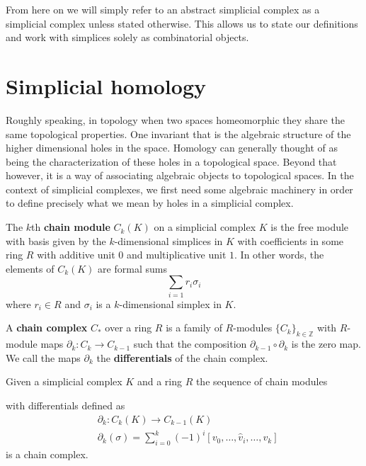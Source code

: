 From here on we will simply refer to an abstract simplicial complex as a simplicial complex unless stated otherwise. This allows us to state our definitions and work with simplices solely as combinatorial objects.
\section{Simplicial homology}
Roughly speaking, in topology when two spaces homeomorphic they share the same topological properties. One invariant that is the algebraic structure of the higher dimensional holes in the space.
Homology can generally thought of as being the characterization of these holes in a topological space. Beyond that however, it is a way of associating algebraic objects to topological spaces. In the context of simplicial complexes, we first need some algebraic machinery in order to define precisely what we mean by holes in a simplicial complex.

\begin{definition}
  The $k$th \textbf{chain module} $C_{k}(K)$ on a simplicial complex $K$ is the free module with basis given by the $k$-dimensional simplices in $K$ with coefficients in some ring $R$ with additive unit $0$ and multiplicative unit $1$. In other words, the elements of $C_{k}(K)$ are formal sums
  \[ \sum_{i=1} r_{i}\sigma_{i}\]
  where $r_{i} \in R$ and $\sigma_{i}$ is a $k$-dimensional simplex in $K$.
\end{definition}
\begin{definition}
  A \textbf{chain complex} $C_{*}$ over a ring $R$ is a family of $R$-modules $\{C_{k}\}_{k
  \in \mathbb{Z}}$ with $R$-module maps $\partial_{k}: C_{k} \to C_{k-1}$ such that the composition $\partial_{k-1} \circ \partial_{k}$ is the zero map. We call the maps $\partial_{k}$ the \textbf{differentials} of the chain complex.
\end{definition}

\begin{theorem}\label{simpchainthm}
Given a simplicial complex $K$ and a ring $R$ the sequence of chain modules
\begin{center}
\end{center}
with differentials defined as
\begin{align*}
& \partial_{k}:  C_{k}(K) \to C_{k-1}(K) \\
& \partial_{k}(\sigma) =  \sum^{k}_{{i=0}} (-1)^{i} [v_{0},\dots,\hat v_{i}, \dots, v_{k}]
\end{align*}
is a chain complex.
\end{theorem}

